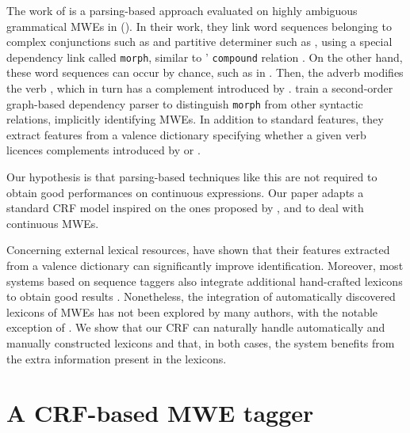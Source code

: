 \documentclass[output=paper,
modfonts
]{langscibook}
\begin{document}
The work of \citet{nasr:acl:2015} is a parsing-based approach evaluated on highly ambiguous grammatical MWEs in  (). In their work, they link word sequences belonging to complex conjunctions such as  and partitive determiner such as , using a special dependency link called \texttt{morph}, similar to ' \texttt{compound} relation \citep{univdep}. On the other hand, these word sequences can occur by chance, such as in . Then, the adverb  modifies the verb , which in turn has a complement introduced by . \citet{nasr:acl:2015} train a second-order graph-based dependency parser to distinguish \texttt{morph} from other syntactic relations, implicitly identifying MWEs. In addition to standard features, they extract features from a valence dictionary specifying whether a given verb licences complements introduced by  or .

Our hypothesis is that parsing-based techniques like this are not required to obtain good performances on continuous expressions. Our paper adapts a standard CRF model inspired on the ones proposed by \citet{constant-sigogne:2011:MWE}, \citet{riedl-biemann:2016:MWE} and \citet{shigeto-EtAl:2013:MWE} to deal with continuous MWEs. 

Concerning external lexical resources, \citet{nasr:acl:2015} have shown that their features extracted from a valence dictionary can significantly improve identification. Moreover, most systems based on sequence taggers also integrate additional hand-crafted lexicons to obtain good results \citep{constant-sigogne:2011:MWE,Schneider14b}. Nonetheless, the integration of automatically discovered lexicons of MWEs has not been explored by many authors, with the notable exception of  \citet{riedl-biemann:2016:MWE}. We show that our CRF can naturally handle automatically and manually constructed lexicons and that, in both cases, the system benefits from the extra information present in the lexicons.

\section{A CRF-based MWE tagger}
\label{schol:sec:crf}
\end{document}
